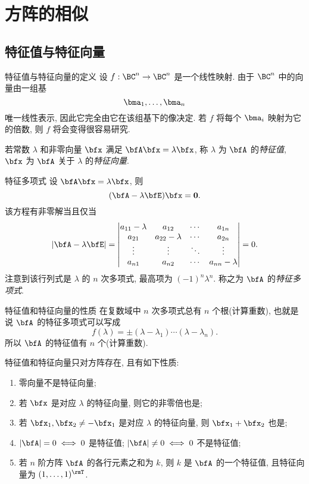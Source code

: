 \section{方阵的相似}

\subsection{特征值与特征向量}

\begin{frame}{特征值与特征向量的定义}
	\onslide<+->
	设 $f:\BC^n\to \BC^n$ 是一个线性映射.
	\onslide<+->
	由于 $\BC^n$ 中的向量由一组基
	\[\bma_1,\dots,\bma_n\]
	唯一线性表示, 因此它完全由它在该组基下的像决定.
	\onslide<+->
	若 $f$ 将每个 $\bma_i$ 映射为它的倍数, 则 $f$ 将会变得很容易研究.

	\onslide<+->
	\begin{definition}
		若常数 $\lambda$ 和非零向量 $\bfx$ 满足 $\bfA\bfx=\lambda\bfx$, 称 $\lambda$ 为 $\bfA$ 的\emph{特征值}, $\bfx$ 为 $\bfA$ 关于 $\lambda$ 的\emph{特征向量}.
	\end{definition}
\end{frame}


\begin{frame}{特征多项式}
	\onslide<+->
	设 $\bfA\bfx=\lambda\bfx$, 则
	\[(\bfA-\lambda\bfE)\bfx={\bf0}.\]
	\onslide<+->
	该方程有非零解当且仅当
	\[|\bfA-\lambda\bfE|=\begin{vmatrix}
		a_{11}-\lambda&a_{12}&\cdots&a_{1n}\\
		a_{21}&a_{22}-\lambda&\cdots&a_{2n}\\
		\vdots&\vdots&\ddots&\vdots\\
		a_{n1}&a_{n2}&\cdots&a_{nn}-\lambda
	\end{vmatrix}=0.\]
	\onslide<+->
	注意到该行列式是 $\lambda$ 的 $n$ 次多项式, 最高项为 $(-1)^n\lambda^n$.
	\onslide<+->
	称之为 $\bfA$ 的\emph{特征多项式}.
\end{frame}


\begin{frame}{特征值和特征向量的性质}
	\onslide<+->
	在复数域中 $n$ 次多项式总有 $n$ 个根(计算重数),
	\onslide<+->
	也就是说 $\bfA$ 的特征多项式可以写成
	\[f(\lambda)=\pm(\lambda-\lambda_1)\cdots(\lambda-\lambda_n).\]
	\onslide<+->
	所以 $\bfA$ 的\alert{特征值有 $n$ 个(计算重数)}.

	\onslide<+->
	特征值和特征向量只对方阵存在, 且有如下性质:
	\begin{enumerate}\bf
		\item 零向量不是特征向量;
		\item 若 $\bfx$ 是对应 $\lambda$ 的特征向量, 则它的非零倍也是;
		\item 若 $\bfx_1,\bfx_2\neq-\bfx_1$ 是对应 $\lambda$ 的特征向量, 则 $\bfx_1+\bfx_2$ 也是;
		\item $|\bfA|=0\iff 0$ 是特征值; $|\bfA|\neq0\iff 0$ 不是特征值;
		\item 若 $n$ 阶方阵 $\bfA$ 的各行元素之和为 $k$, 则 $k$ 是 $\bfA$ 	的一个特征值, 且特征向量为 $(1,\dots,1)^\rmT$.
	\end{enumerate}
\end{frame}


